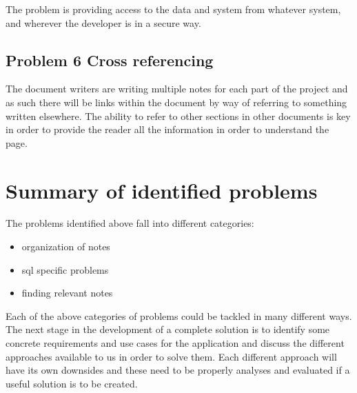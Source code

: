 The problem is providing access to the data and system from whatever
system, and wherever the developer is in a secure way.

\subsection{Problem 6 Cross
referencing}\label{problem-6-cross-referencing}

The document writers are writing multiple notes for each part of the
project and as such there will be links within the document by way of
referring to something written elsewhere. The ability to refer to other
sections in other documents is key in order to provide the reader all
the information in order to understand the page.

\section{Summary of identified
problems}\label{summary-of-identified-problems}

The problems identified above fall into different categories:

\begin{itemize}
\tightlist
\item
  organization of notes
\item
  sql specific problems
\item
  finding relevant notes
\end{itemize}

Each of the above categories of problems could be tackled in many
different ways. The next stage in the development of a complete solution
is to identify some concrete requirements and use cases for the
application and discuss the different approaches available to us in
order to solve them. Each different approach will have its own downsides
and these need to be properly analyses and evaluated if a useful
solution is to be created.
